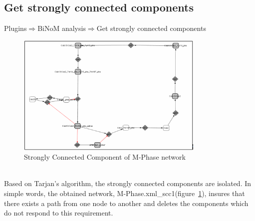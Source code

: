 \subsection{Get strongly connected components}
Plugins$\Rightarrow$BiNoM analysis$\Rightarrow$Get strongly connected components\\
\begin{figure}
\centering
\includegraphics[width=0.8\textwidth]{graphics/Strongly_Connected_Component_of_M-Phase_network.png}
\caption{Strongly Connected Component of M-Phase network}
\label{Strongly_Connected_Component_of M-Phase_network}
\end{figure}
\\Based on Tarjan’s algorithm\cite{tarjan1972depth}, the strongly connected components are isolated. In simple words, the obtained network, M-Phase.xml\_scc1(figure~\ref{Strongly_Connected_Component_of M-Phase_network}), insures that there exists a path from one node to another and deletes the components which do not respond to this requirement.

